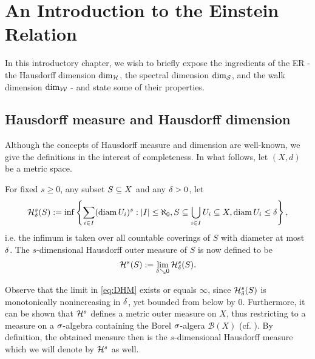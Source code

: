 \chapter{An Introduction to the Einstein Relation}

In this introductory chapter, we wish to briefly expose the ingredients of the ER - the Hausdorff dimension $\dim_{\mathcal{H}}$, the spectral dimension $\dim_{\mathcal{S}}$, and the walk dimension $\dim_{\mathcal{W}}$ - and state some of their properties. 

\section{Hausdorff measure and Hausdorff dimension}

Although the concepts of Hausdorff measure and dimension are well-known, we give the definitions in the interest of completeness. In what follows, let $(X,d)$ be a metric space.
\begin{defin}
  For fixed $s\geq0$, any subset $S\subseteq X$ and any $\delta>0$, let 
  \[
    \mathcal{H}^s_\delta(S)
      :=\inf \left\{\sum_{i\in I}(\operatorname{diam} U_i)^s:
            |I|\leq\aleph_0,S\subseteq\bigcup_{i\in I}U_i\subseteq X,\operatorname{diam} U_i\leq\delta\right\},
  \]
  i.e. the infimum is taken over all countable coverings of $S$ with diameter at most $\delta$. The $s$-dimensional Hausdorff outer measure of $S$ is now defined to be
  \begin{equation}\label{eq:DHM}
    \mathcal{H}^s(S):=\lim_{\delta\searrow0}\mathcal{H}^s_\delta(S).
  \end{equation}
\end{defin}
Observe that the limit in \eqref{eq:DHM} exists or equals $\infty$, since $\mathcal{H}^s_\delta(S)$ is monotonically nonincreasing in $\delta$, yet bounded from below by 0. Furthermore, it can be shown that $\mathcal{H}^s$ defines a metric outer measure on $X$, thus restricting to a measure on a $\sigma$-algebra containing the Borel $\sigma$-algera $\mathcal{B}(X)$ (cf. \cite[p.54ff]{mattila1999geometry}). By definition, the obtained measure then is the $s$-dimensional Hausdorff measure which we will denote by $\mathcal{H}^s$ as well.

